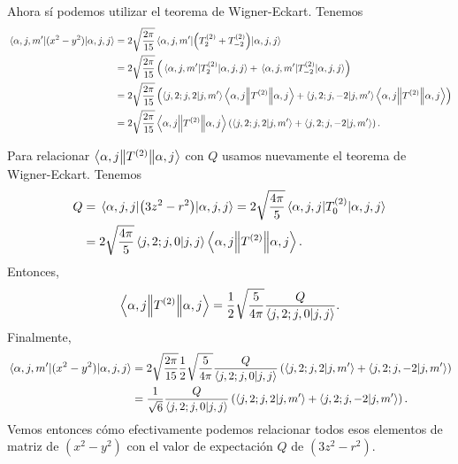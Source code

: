 \documentclass[10pt, a4paper]{article}
\numberwithin{equation}{subsection}
\begin{document}
Ahora sí podemos utilizar el teorema de Wigner-Eckart. Tenemos
\begin{align}
  \matrixel{\alpha,j,m'}{(x^2 - y^2)}{\alpha,j,j}
  &= 2\sqrt{\frac{2\pi}{15}}\matrixel{\alpha,j,m'}{\left(T^{(2)}_{2} +
    T^{(2)}_{-2}\right)}{\alpha,j,j} \nonumber \\
  &= 2\sqrt{\frac{2\pi}{15}}\left(
    \matrixel{\alpha,j,m'}{T^{(2)}_{2}}{\alpha,j,j} +
    \matrixel{\alpha,j,m'}{T^{(2)}_{-2}}{\alpha,j,j}\right) \nonumber \\
  &= 2\sqrt{\frac{2\pi}{15}} \left( \ClebschGordan{j}{2}{j}{2}{j}{m'}
    \doublebarmel{\alpha,j}{T^{(2)}}{\alpha,j} +
    \ClebschGordan{j}{2}{j}{-2}{j}{m'}
    \doublebarmel{\alpha,j}{T^{(2)}}{\alpha,j}\right) \nonumber \\
  &= 2\sqrt{\frac{2\pi}{15}} \doublebarmel{\alpha,j}{T^{(2)}}{\alpha,j}
    \left( \ClebschGordan{j}{2}{j}{2}{j}{m'} +
      \ClebschGordan{j}{2}{j}{-2}{j}{m'} \right).
\end{align}

Para relacionar $\left\langle{\alpha,j}\middle\|{T^{(2)}}\middle\|{\alpha,j}\right\rangle$ con $Q$ usamos
nuevamente el teorema de Wigner-Eckart. Tenemos
\begin{align}
  Q &= \expval{\left(3z^2 - r^2\right)}{\alpha,j,j}
    = 2\sqrt{\frac{4\pi}{5}}\expval{T^{(2)}_{0}}{\alpha,j,j} \nonumber \\
    &= 2\sqrt{\frac{4\pi}{5}} \braket{{j},{2};{j},{0}}{{j},{j}}
      \left\langle{\alpha,j}\middle\|{T^{(2)}}\middle\|{\alpha,j}\right\rangle.
\end{align}
Entonces,
\begin{equation} \label{eq:Qdoublebar}
  \left\langle{\alpha,j}\middle\|{T^{(2)}}\middle\|{\alpha,j}\right\rangle =
  \frac{1}{2}\sqrt{\frac{5}{4\pi}} \frac{Q}{\braket{{j},{2};{j},{0}}{{j},{j}}}.
\end{equation}
Finalmente,
\begin{align} \label{eq:Qauxmatrixel}
  \matrixel{\alpha,j,m'}{(x^2 - y^2)}{\alpha,j,j}
    &= 2\sqrt{\frac{2\pi}{15}} 
    \frac{1}{2}\sqrt{\frac{5}{4\pi}} \frac{Q}{\ClebschGordan{j}{2}{j}{0}{j}{j}}
    \left( \ClebschGordan{j}{2}{j}{2}{j}{m'} +
      \ClebschGordan{j}{2}{j}{-2}{j}{m'} \right) \nonumber \\
  &= \frac{1}{\sqrt{6}} \frac{Q}{\ClebschGordan{j}{2}{j}{0}{j}{j}}
    \left( \ClebschGordan{j}{2}{j}{2}{j}{m'} +
      \ClebschGordan{j}{2}{j}{-2}{j}{m'} \right).
\end{align}
Vemos entonces cómo efectivamente podemos relacionar todos esos elementos de
matriz de $(x^2 - y^2)$ con el valor de expectación $Q$ de $(3z^2 - r^2)$.
\end{document}
